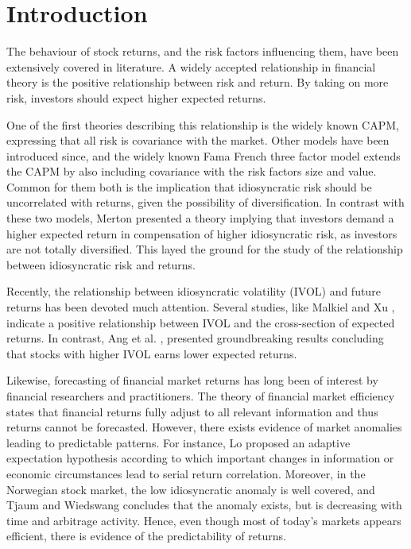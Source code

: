 \chapter{Introduction}
The behaviour of stock returns, and the risk factors influencing them, have been extensively covered in literature. A widely accepted relationship in financial theory is the positive relationship between risk and return. By taking on more risk, investors should expect higher expected returns.

One of the first theories describing this relationship is the widely known CAPM, expressing that all risk is covariance with the market. Other models have been introduced since, and the widely known Fama French three factor model \cite{famafrench} extends the CAPM by also including covariance with the risk factors size and value. Common for them both is the implication that idiosyncratic risk should be uncorrelated with returns, given the possibility of diversification. In contrast with these two models, Merton \cite{merton87} presented a theory implying that investors demand a higher expected return in compensation of higher idiosyncratic risk, as investors are not totally diversified. This layed the ground for the study of the relationship between idiosyncratic risk and returns.

Recently, the relationship between idiosyncratic volatility (IVOL) and future returns has been devoted much attention. Several studies, like Malkiel and Xu \cite{malkielxu02}, indicate a positive relationship between IVOL and the cross-section of expected returns. In contrast, Ang et al. \cite{angetal06}, presented groundbreaking results concluding that stocks with higher IVOL earns lower expected returns.

Likewise, forecasting of financial market returns has long been of interest by financial researchers and practitioners. The theory of financial market efficiency states that financial returns fully adjust to all relevant information and thus returns cannot be forecasted. However, there exists evidence of market anomalies leading to predictable patterns. For instance, Lo \cite{Lo} proposed an adaptive expectation hypothesis according to which important changes in information or economic circumstances lead to serial return correlation. Moreover, in the Norwegian stock market, the low idiosyncratic anomaly is well covered, and Tjaum and Wiedswang \cite{thaumwiedswang} concludes that the anomaly exists, but is decreasing with time and arbitrage activity. Hence, even though most of today's markets appears efficient, there is evidence of the predictability of returns.

